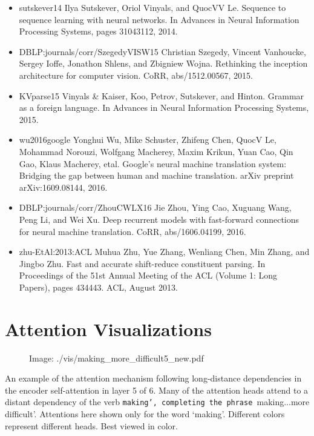 \documentclass[11pt,a4paper]{article}
\begin{document}
\begin{itemize}
Sainbayar Sukhbaatar, Arthur Szlam, Jason Weston, and Rob Fergus.
End-to-end memory networks.
In C.Cortes, N.D. Lawrence, D.D. Lee, M.Sugiyama, and R.Garnett,
  editors, Advances in Neural Information Processing Systems 28, pages
  24402448. Curran Associates, Inc., 2015.
\item sutskever14
Ilya Sutskever, Oriol Vinyals, and QuocVV Le.
Sequence to sequence learning with neural networks.
In Advances in Neural Information Processing Systems, pages
  31043112, 2014.
\item DBLP:journals/corr/SzegedyVISW15
Christian Szegedy, Vincent Vanhoucke, Sergey Ioffe, Jonathon Shlens, and
  Zbigniew Wojna.
Rethinking the inception architecture for computer vision.
CoRR, abs/1512.00567, 2015.
\item KVparse15
Vinyals \& Kaiser, Koo, Petrov, Sutskever, and Hinton.
Grammar as a foreign language.
In Advances in Neural Information Processing Systems, 2015.
\item wu2016google
Yonghui Wu, Mike Schuster, Zhifeng Chen, QuocV Le, Mohammad Norouzi, Wolfgang
  Macherey, Maxim Krikun, Yuan Cao, Qin Gao, Klaus Macherey, etal.
Google's neural machine translation system: Bridging the gap between
  human and machine translation.
arXiv preprint arXiv:1609.08144, 2016.
\item DBLP:journals/corr/ZhouCWLX16
Jie Zhou, Ying Cao, Xuguang Wang, Peng Li, and Wei Xu.
Deep recurrent models with fast-forward connections for neural
  machine translation.
CoRR, abs/1606.04199, 2016.
\item zhu-EtAl:2013:ACL
Muhua Zhu, Yue Zhang, Wenliang Chen, Min Zhang, and Jingbo Zhu.
Fast and accurate shift-reduce constituent parsing.
In Proceedings of the 51st Annual Meeting of the ACL (Volume 1:
 Long Papers), pages 434443. ACL, August 2013.
\end{itemize}

\section{Attention Visualizations}

\begin{figure}[h]
\caption{Image: ./vis/making\_more\_difficult5\_new.pdf}
\end{figure}

An example of the attention mechanism following long-distance dependencies in the encoder self-attention in layer 5 of 6. Many of the attention heads attend to a distant dependency of the verb \texttt{making', completing the phrase }making...more difficult'. Attentions here shown only for the word `making'. Different colors represent different heads. Best viewed in color.
\end{document}
